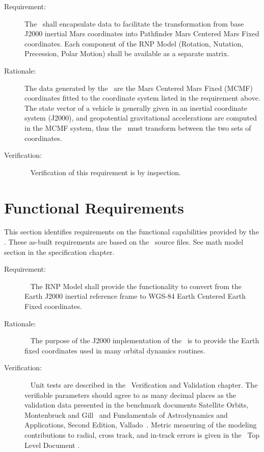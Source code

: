 \label{reqt:mars_RNP_data}
\begin{description}
  \item[Requirement:]
The \ModelDesc\ shall encapsulate data to facilitate
the transformation from base J2000 inertial Mars coordinates 
into Pathfinder Mars Centered Mars Fixed coordinates. Each component of the
RNP Model (Rotation, Nutation, Precession, Polar Motion) shall be available
as a separate matrix.
  \item[Rationale:]
The data generated by the \ModelDesc\ are the Mars Centered Mars Fixed (MCMF) 
coordinates fitted to the coordinate system listed in the requirement above.  
The state vector of a vehicle is generally given in an inertial coordinate 
system (J2000), and geopotential gravitational accelerations are 
computed in the MCMF system, thus the \ModelDesc\ must transform between
the two sets of coordinates.
  \item[Verification:]\ \newline
Verification of this requirement is by inspection.
\end{description}

\section{Functional Requirements}

This section identifies requirements on the functional capabilities provided 
by the \ModelDesc.  These as-built requirements are based on the \ModelDesc\ source files.  
See math model section in the specification chapter.

\label{reqt:earth_RNP_func}
\begin{description}
  \item[Requirement:]\ \newline
The RNP Model shall provide the functionality to convert from the Earth J2000
inertial reference frame to WGS-84 Earth Centered Earth Fixed coordinates.
  \item[Rationale:]\ \newline
The purpose of the J2000 implementation of the
\ModelDesc\ is to provide the Earth fixed 
coordinates used in many orbital dynamics routines.
  \item[Verification:]\ \newline
Unit tests are described in the \ModelDesc\ Verification and
Validation chapter. The verifiable 
parameters should agree to as many decimal places as the 
validation data presented in the benchmark documents Satellite Orbits, 
Montenbruck and Gill~\cite{MG} and Fundamentals of Astrodynamics and 
Applications, Second Edition, Vallado~\cite{VMcC}.  
Metric measuring of the modeling contributions to radial, cross track, 
and in-track errors is given in the \JEODid\ Top Level Document
\cite{dynenv:JEOD}.
\end{description}

